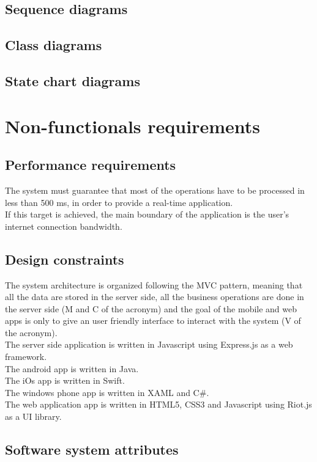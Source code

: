 \subsection{Sequence diagrams}

\subsection{Class diagrams}

\subsection{State chart diagrams}

\section{Non-functionals requirements}

\subsection{Performance requirements}
The system must guarantee that most of the operations have to be processed in less than 500 ms, in order to provide a real-time application.\\
If this target is achieved, the main boundary of the application is the user’s internet connection bandwidth.

\subsection{Design constraints}
The system architecture is organized following the MVC pattern, meaning that all the data are stored in the server side, all the business operations are done in the server side (M and C of the acronym) and the goal of the mobile and web apps is only to give an user friendly interface to interact with the system (V of the acronym).\\
The server side application is written in Javascript using Express.js as a web framework.\\
The android app is written in Java.\\
The iOs app is written in Swift.\\
The windows phone app is written in XAML and C\#.\\
The web application app is written in HTML5, CSS3 and Javascript using Riot.js as a UI library.

\subsection{Software system attributes}

